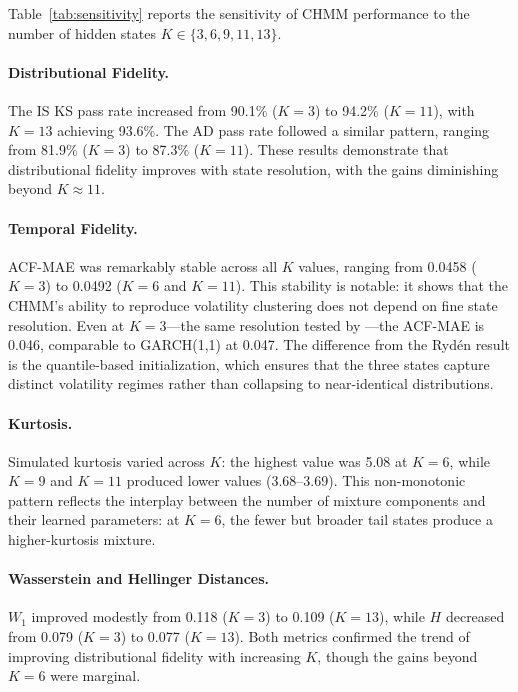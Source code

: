 Table~\ref{tab:sensitivity} reports the sensitivity of CHMM performance to the number of hidden states $K \in \{3, 6, 9, 11, 13\}$.

\paragraph{Distributional Fidelity.}
The IS KS pass rate increased from 90.1\% ($K = 3$) to 94.2\% ($K = 11$), with $K = 13$ achieving 93.6\%.
The AD pass rate followed a similar pattern, ranging from 81.9\% ($K = 3$) to 87.3\% ($K = 11$).
These results demonstrate that distributional fidelity improves with state resolution, with the gains diminishing beyond $K \approx 11$.

\paragraph{Temporal Fidelity.}
ACF-MAE was remarkably stable across all $K$ values, ranging from 0.0458 ($K = 3$) to 0.0492 ($K = 6$ and $K = 11$).
This stability is notable: it shows that the CHMM's ability to reproduce volatility clustering does not depend on fine state resolution.
Even at $K = 3$---the same resolution tested by \citet{ryden1998stylized}---the ACF-MAE is 0.046, comparable to GARCH(1,1) at 0.047.
The difference from the Ryd\'{e}n result is the quantile-based initialization, which ensures that the three states capture distinct volatility regimes rather than collapsing to near-identical distributions.

\paragraph{Kurtosis.}
Simulated kurtosis varied across $K$: the highest value was 5.08 at $K = 6$, while $K = 9$ and $K = 11$ produced lower values (3.68--3.69).
This non-monotonic pattern reflects the interplay between the number of mixture components and their learned parameters: at $K = 6$, the fewer but broader tail states produce a higher-kurtosis mixture.

\paragraph{Wasserstein and Hellinger Distances.}
$W_1$ improved modestly from 0.118 ($K = 3$) to 0.109 ($K = 13$), while $H$ decreased from 0.079 ($K = 3$) to 0.077 ($K = 13$).
Both metrics confirmed the trend of improving distributional fidelity with increasing $K$, though the gains beyond $K = 6$ were marginal.

